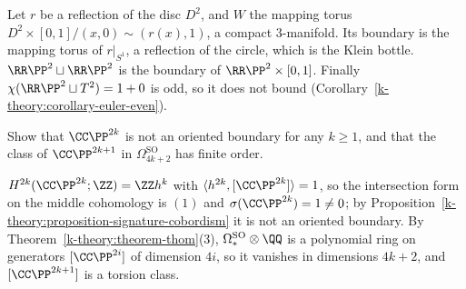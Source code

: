 \begin{solution}
Let $r$ be a reflection of the disc $D^2$, and $W$ the mapping torus $D^2 \times [0, 1]/(x, 0) \sim (r(x), 1)$, a compact $3$-manifold. Its boundary is the mapping torus of $r|_{S^1}$, a reflection of the circle, which is the
Klein bottle. $\RR\PP^2 \sqcup \RR\PP^2$ is the boundary of $\RR\PP^2 \times [0, 1]$. Finally $\chi(\RR\PP^2 \sqcup T^2) = 1 + 0$ is odd, so it does not bound (Corollary~\ref{k-theory:corollary-euler-even}).
\end{solution}

\begin{exercise}\label{k-theory:exercise-projective-signature}
Show that $\CC\PP^{2k}$ is not an oriented boundary for any $k \geq 1$, and that the class of $\CC\PP^{2k+1}$ in $\Omega^{\mathrm{SO}}_{4k+2}$ has finite order.
\end{exercise}

\begin{solution}
$H^{2k}(\CC\PP^{2k}; \ZZ) = \ZZ h^k$ with $\langle h^{2k}, [\CC\PP^{2k}]\rangle = 1$, so the intersection form on the middle cohomology is $(1)$ and $\sigma(\CC\PP^{2k}) = 1 \neq 0$; by
Proposition~\ref{k-theory:proposition-signature-cobordism} it is not an oriented boundary. By Theorem~\ref{k-theory:theorem-thom}(3), $\Omega^{\mathrm{SO}}_* \otimes \QQ$ is a polynomial ring on generators $[\CC\PP^{2i}]$ of dimension $4i$, so it vanishes in dimensions $4k + 2$, and
$[\CC\PP^{2k+1}]$ is a torsion class.
\end{solution}
